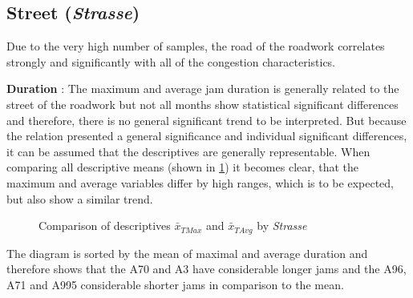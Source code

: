 \subsection{Street (\textit{Strasse})}
\label{analysis_arbis_sum_Strasse}
Due to the very high number of samples, the road of the roadwork correlates strongly and significantly with all of the congestion characteristics. 

\textbf{Duration} : The maximum and average jam duration is generally related to the street of the roadwork but not all months show statistical significant differences and therefore, there is no general significant trend to be interpreted. But because the relation presented a general significance and individual significant differences, it can be assumed that the descriptives are generally representable. When comparing all descriptive means (shown in \cref{fig:arbis_summary_Str_temporal}) it becomes clear, that the maximum and average variables differ by high ranges, which is to be expected, but also show a similar trend.
\begin{figure}[ht!]
	\data
	\pgfplotstablesort[sort key=means, sort cmp=float >]{\datasorted}{\data}
	\tiny
	\centering
	\caption{Comparison of descriptives $\bar{x}_{TMax}$ and $\bar{x}_{TAvg}$ by \textit{Strasse}}
	\label{fig:arbis_summary_Str_temporal}
\end{figure}
The diagram is sorted by the mean of maximal and average duration and therefore shows that the A70 and A3 have considerable longer jams and the A96, A71 and A995 considerable shorter jams in comparison to the mean. 

